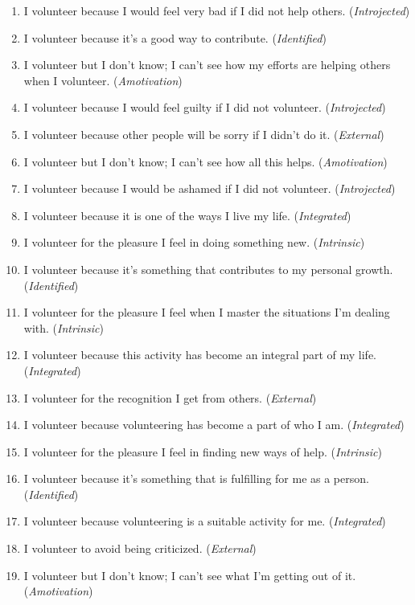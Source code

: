 \begin{enumerate}
    \item I volunteer because I would feel very bad if I did not help others. (\textit{Introjected})
    \item I volunteer because it's a good way to contribute. (\textit{Identified})
    \item I volunteer but I don't know; I can't see how my efforts are helping others when I volunteer. (\textit{Amotivation})
    \item I volunteer because I would feel guilty if I did not volunteer. (\textit{Introjected})
    \item I volunteer because other people will be sorry if I didn't do it. (\textit{External})
    \item I volunteer but I don't know; I can't see how all this helps. (\textit{Amotivation})
    \item I volunteer because I would be ashamed if I did not volunteer. (\textit{Introjected})
    \item I volunteer because it is one of the ways I live my life. (\textit{Integrated})
    \item I volunteer for the pleasure I feel in doing something new. (\textit{Intrinsic})
    \item I volunteer because it's something that contributes to my personal growth. (\textit{Identified})
    \item I volunteer for the pleasure I feel when I master the situations I'm dealing with. (\textit{Intrinsic})
    \item I volunteer because this activity has become an integral part of my life. (\textit{Integrated})
    \item I volunteer for the recognition I get from others. (\textit{External})
    \item I volunteer because volunteering has become a part of who I am. (\textit{Integrated})
    \item I volunteer for the pleasure I feel in finding new ways of help. (\textit{Intrinsic})
    \item I volunteer because it's something that is fulfilling for me as a person. (\textit{Identified})
    \item I volunteer because volunteering is a suitable activity for me. (\textit{Integrated})
    \item I volunteer to avoid being criticized. (\textit{External})
    \item I volunteer but I don't know; I can't see what I’m getting out of it. (\textit{Amotivation})

\end{enumerate}
